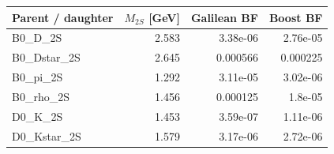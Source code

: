 \begin{tabular}{lrrr}
\toprule
Parent / daughter & $M_{2S}$ [GeV] & Galilean BF & Boost BF \\
\midrule
B0\_D\_2S & 2.583 & 3.38e-06 & 2.76e-05 \\
B0\_Dstar\_2S & 2.645 & 0.000566 & 0.000225 \\
B0\_pi\_2S & 1.292 & 3.11e-05 & 3.02e-06 \\
B0\_rho\_2S & 1.456 & 0.000125 & 1.8e-05 \\
D0\_K\_2S & 1.453 & 3.59e-07 & 1.11e-06 \\
D0\_Kstar\_2S & 1.579 & 3.17e-06 & 2.72e-06 \\
\bottomrule
\end{tabular}
